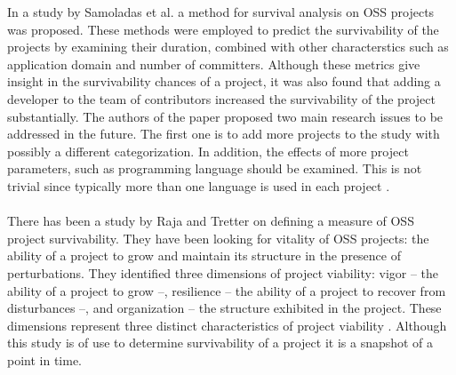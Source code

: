 In a study by Samoladas et al. a method for survival analysis on OSS projects
was proposed. These methods were employed to predict the
survivability of the projects by examining their duration, combined with other
characterstics such as application domain and number of committers. Although
these metrics give insight in the survivability chances of a project, it was
also found that adding a developer to the team of contributors increased the
survivability of the project substantially. The authors of the paper proposed
two main research issues to be addressed in the future. The first one is to add
more projects to the study with possibly a different categorization. In
addition, the effects of more project parameters, such as programming language
should be examined. This is not trivial since typically more than one language
is used in each project \cite{samoladas2010}.

\paragraph{}
There has been a study by Raja and Tretter on defining a measure of OSS project
survivability. They have been looking for vitality of OSS projects: the ability
of a project to grow and maintain its structure in the presence of
perturbations. They identified three dimensions of project viability: vigor --
the ability of a project to grow --, resilience -- the ability of a project to
recover from disturbances --, and organization -- the structure exhibited in the
project. These dimensions represent three distinct characteristics of project
viability \cite{raja2012}. Although this study is of use to determine
survivability of a project it is a snapshot of a point in time.

\paragraph{}

